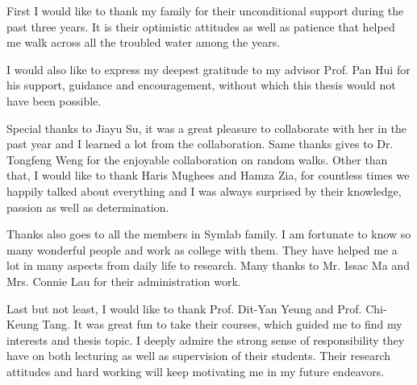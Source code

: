 \acknowledgments

First I would like to thank my family for their unconditional support during the past three years. It is their optimistic attitudes as well as patience that helped me walk across all the troubled water among the years.

I would also like to express my deepest gratitude to my advisor Prof. Pan Hui for his support, guidance and encouragement, without which this thesis would not have been possible.

Special thanks to Jiayu Su, it was a great pleasure to collaborate with her in the past year and I learned a lot from the collaboration. Same thanks gives to Dr. Tongfeng Weng for the enjoyable collaboration on random walks. Other than that, I would like to thank Haris Mughees and Hamza Zia, for countless times we happily talked about everything and I was always surprised by their knowledge, passion as well as determination.

Thanks also goes to all the members in Symlab family. I am fortunate to know so many wonderful people and work as college with them. They have helped me a lot in many aspects from daily life to research. Many thanks to Mr. Issac Ma and Mrs. Connie Lau for their administration work.

Last but not least, I would like to thank Prof. Dit-Yan Yeung and Prof. Chi-Keung Tang. It was great fun to take their courses, which guided me to find my interests and thesis topic. I deeply admire the strong sense of responsibility they have on both lecturing as well as supervision of their students. Their research attitudes and hard working will keep motivating me in my future endeavors.

\endacknowledgments

